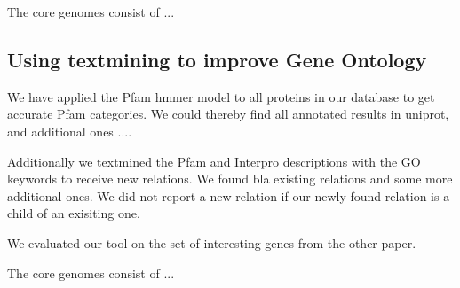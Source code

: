 \documentclass[a4,center,fleqn]{NAR}
\begin{document}
\begin{table}[b]
{The core genomes consist of ...}
\end{table}

\subsection{Using textmining to improve Gene Ontology}

We have applied the Pfam hmmer model to all proteins in our database to get accurate Pfam categories.
We could thereby find all annotated results in uniprot, and additional ones ....

Additionally we textmined the Pfam and Interpro descriptions with the GO keywords to receive new relations. We found bla existing relations and some more additional ones.
We did not report a new relation if our newly found relation is a child of an exisiting one.

We evaluated our tool on the set of interesting genes from the other paper.


\begin{table}[b]
	{The core genomes consist of ...}
\end{table}
\end{document}
